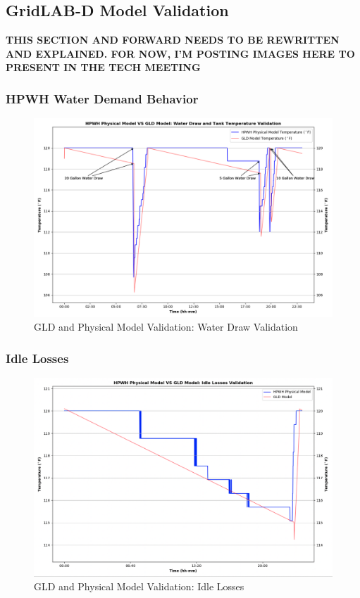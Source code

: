 \subsection{GridLAB-D Model Validation}
\textbf{THIS SECTION AND FORWARD NEEDS TO BE REWRITTEN AND EXPLAINED. FOR NOW, I'M POSTING IMAGES HERE TO PRESENT IN THE TECH MEETING}
\newpage
\subsubsection{HPWH Water Demand Behavior}
\begin{figure}[H]
    \centering
    \includegraphics[width=1.1\columnwidth]{Pictures/Temperature_validation.png}
    \caption{GLD and Physical Model Validation: Water Draw Validation}
\end{figure}

\newpage
\subsubsection{Idle Losses}
\begin{figure}[H]
    \centering
    \includegraphics[width=1.1\columnwidth]{Pictures/idle_losses.png}
    \caption{GLD and Physical Model Validation: Idle Losses}
\end{figure}

